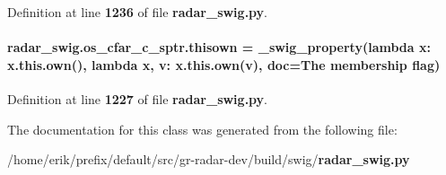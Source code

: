 Definition at line {\bf 1236} of file {\bf radar\+\_\+swig.\+py}.

\paragraph[{thisown}]{\setlength{\rightskip}{0pt plus 5cm}radar\+\_\+swig.\+os\+\_\+cfar\+\_\+c\+\_\+sptr.\+thisown = {\bf \+\_\+swig\+\_\+property}(lambda x\+: x.\+this.\+own(), lambda {\bf x}, v\+: x.\+this.\+own(v), doc=\textquotesingle{}The membership flag\textquotesingle{})\hspace{0.3cm}{\ttfamily [static]}}\label{classradar__swig_1_1os__cfar__c__sptr_abb6a4a72cf89a82d2bf9a9e357757c99}


Definition at line {\bf 1227} of file {\bf radar\+\_\+swig.\+py}.



The documentation for this class was generated from the following file\+:\begin{DoxyCompactItemize}
\item 
/home/erik/prefix/default/src/gr-\/radar-\/dev/build/swig/{\bf radar\+\_\+swig.\+py}\end{DoxyCompactItemize}
